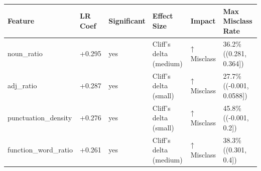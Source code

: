 \begin{tabular}{llllll}
\toprule
Feature & LR Coef & Significant & Effect Size & Impact & Max Misclass Rate \\
\midrule
noun\_ratio & +0.295 & yes & Cliff's delta (medium) & ↑ Misclass & 36.2\% ((0.281, 0.364]) \\
adj\_ratio & +0.287 & yes & Cliff's delta (small) & ↑ Misclass & 27.7\% ((-0.001, 0.0588]) \\
punctuation\_density & +0.276 & yes & Cliff's delta (small) & ↑ Misclass & 45.8\% ((-0.001, 0.2]) \\
function\_word\_ratio & +0.261 & yes & Cliff's delta (medium) & ↑ Misclass & 38.3\% ((0.301, 0.4]) \\
\bottomrule
\end{tabular}
